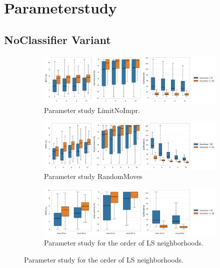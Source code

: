\clearpage


\section{Parameterstudy}

\subsection{NoClassifier Variant}
\label{app:subsec:parameterstudy_noclassifier}


\begin{figure}[!ht]
	\centering
	\begin{subfigure}[t]{0.83\textwidth}
		\centering
		\caption{Parameter study LimitNoImpr.}
		\includegraphics[width=\textwidth]{pictures/parameter_study/LimitNoImpr_base_parameter_study.png}
	\end{subfigure}
	\begin{subfigure}[t]{0.83\textwidth}
		\centering
		\caption{Parameter study RandomMoves}
		\includegraphics[width=\textwidth]{pictures/parameter_study/RandomMoves_base_parameter_study.png}
	\end{subfigure}
	\begin{subfigure}[t]{0.83\textwidth}
		\centering
		\caption{Parameter study for the order of LS neighborhoods.}
		\includegraphics[width=\textwidth]{pictures/parameter_study/LocalSearchTypes_base_parameter_study.png}

\end{subfigure}
\end{figure}
